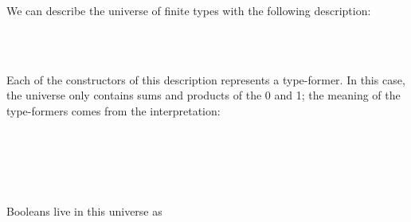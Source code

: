 We can describe the universe of finite types with the following description:
\begin{code}%
\>[0][@{}l@{\AgdaIndent{1}}]%
\>[2]\AgdaSpace{}%
\AgdaSpace{}%
\AgdaSymbol{:}\AgdaSpace{}%
\AgdaSpace{}%
\<%
\\
\>[2][@{}l@{\AgdaIndent{0}}]%
\>[4]\AgdaSpace{}%
%
\>[13]\AgdaSymbol{:}\AgdaSpace{}%
\<%
\\
%
\>[4]\AgdaSpace{}%
%
\>[13]\AgdaSymbol{:}\AgdaSpace{}%
\AgdaSpace{}%
\AgdaSpace{}%
\AgdaSpace{}%
\AgdaSpace{}%
\<%
\end{code}
Each of the constructors of this description represents a type-former. In this case, the universe only contains sums and products of the 0 and 1; the meaning of the type-formers comes from the interpretation:
\begin{code}%
%
\>[2]\AgdaSpace{}%
\AgdaSymbol{:}\AgdaSpace{}%
\AgdaSpace{}%
\AgdaSpace{}%
\<%
\\
%
\>[2]\AgdaSpace{}%
%
\>[13]\AgdaSymbol{=}\AgdaSpace{}%
\<%
\\
%
\>[2]\AgdaSpace{}%
%
\>[13]\AgdaSymbol{=}\AgdaSpace{}%
\<%
\\
%
\>[2]\AgdaSpace{}%
\AgdaSymbol{(}\AgdaSpace{}%
\AgdaSpace{}%
\AgdaSymbol{)}%
\>[13]\AgdaSymbol{=}\AgdaSpace{}%
\AgdaSpace{}%
\AgdaSpace{}%
\AgdaSpace{}%
\AgdaSpace{}%
\<%
\\
%
\>[2]\AgdaSpace{}%
\AgdaSymbol{(}\AgdaSpace{}%
\AgdaSpace{}%
\AgdaSymbol{)}%
\>[13]\AgdaSymbol{=}\AgdaSpace{}%
\AgdaSpace{}%
\AgdaSpace{}%
\AgdaSpace{}%
\AgdaSpace{}%
\<%
\end{code}
Booleans live in this universe as
\begin{code}%
%
\>[2]\AgdaSpace{}%
\AgdaSymbol{:}\AgdaSpace{}%
\<%
\\
%
\>[2]\AgdaSpace{}%
\AgdaSymbol{=}\AgdaSpace{}%
\AgdaSpace{}%
\AgdaSpace{}%
\<%
\end{code}
